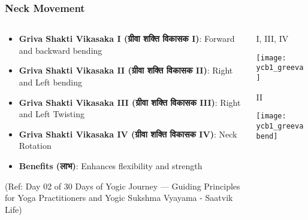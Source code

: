 \begin{frame}[fragile]\frametitle{Neck Movement}
\begin{columns}
    \begin{column}[T]{0.5\linewidth}
      \begin{itemize}
		\item \textbf{Griva Shakti Vikasaka I (ग्रीवा शक्ति विकासक I)}: Forward and backward bending
		\item \textbf{Griva Shakti Vikasaka II (ग्रीवा शक्ति विकासक II)}: Right and Left bending
		\item \textbf{Griva Shakti Vikasaka III (ग्रीवा शक्ति विकासक III)}: Right and Left Twisting
		\item \textbf{Griva Shakti Vikasaka IV (ग्रीवा शक्ति विकासक IV)}: Neck Rotation
		\item \textbf{Benefits (लाभ)}: Enhances flexibility and strength
	  \end{itemize}
	  
				{\tiny (Ref: Day 02 of 30 Days of Yogic Journey — Guiding Principles for Yoga Practitioners and Yogic Sukshma Vyayama - Saatvik Life)}		  
    \end{column}
    \begin{column}[T]{0.5\linewidth}
		\begin{center}
		I, III, IV
		
		        \texttt{[image: ycb1\_greeva]}
				
				
		II
		
				\texttt{[image: ycb1\_greevabend]}

	
		\end{center}	
    \end{column}
\end{columns}

\end{frame}



